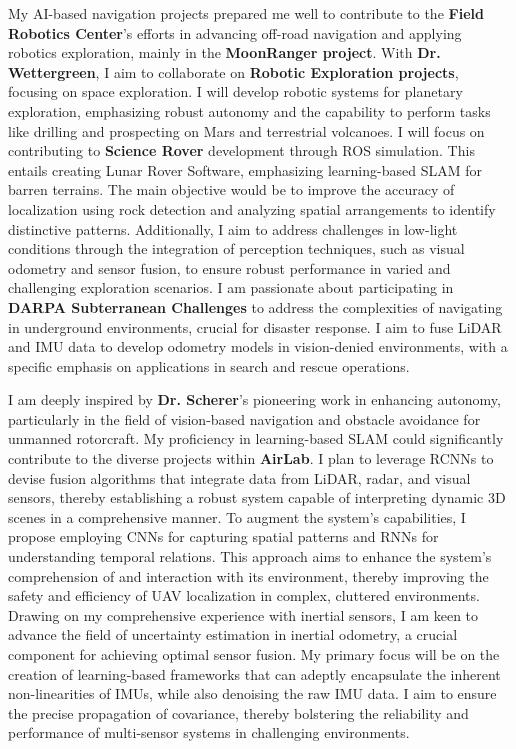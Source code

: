 \documentclass[12pt]{article}
\begin{document}
My AI-based navigation projects prepared me well to contribute to the \textbf{Field Robotics Center}'s efforts in advancing off-road navigation and applying robotics exploration, mainly in the \textbf{MoonRanger project}. With \textbf{Dr. Wettergreen}, I aim to collaborate on \textbf{Robotic Exploration projects}, focusing on space exploration. I will develop robotic systems for planetary exploration, emphasizing robust autonomy and the capability to perform tasks like drilling and prospecting on Mars and terrestrial volcanoes. I will focus on contributing to \textbf{Science Rover} development through ROS simulation. This entails creating Lunar Rover Software, emphasizing learning-based SLAM for barren terrains. The main objective would be to improve the accuracy of localization using rock detection and analyzing spatial arrangements to identify distinctive patterns. Additionally, I aim to address challenges in low-light conditions through the integration of perception techniques, such as visual odometry and sensor fusion, to ensure robust performance in varied and challenging exploration scenarios. I am passionate about participating in \textbf{DARPA Subterranean Challenges} to address the complexities of navigating in underground environments, crucial for disaster response. I aim to fuse LiDAR and IMU data to develop odometry models in vision-denied environments, with a specific emphasis on applications in search and rescue operations.

I am deeply inspired by \textbf{Dr. Scherer}'s pioneering work in enhancing autonomy, particularly in the field of vision-based navigation and obstacle avoidance for unmanned rotorcraft. My proficiency in learning-based SLAM could significantly contribute to the diverse projects within \textbf{AirLab}. I plan to leverage RCNNs to devise fusion algorithms that integrate data from LiDAR, radar, and visual sensors, thereby establishing a robust system capable of interpreting dynamic 3D scenes in a comprehensive manner. To augment the system’s capabilities, I propose employing CNNs for capturing spatial patterns and RNNs for understanding temporal relations. This approach aims to enhance the system’s comprehension of and interaction with its environment, thereby improving the safety and efficiency of UAV localization in complex, cluttered environments. Drawing on my comprehensive experience with inertial sensors, I am keen to advance the field of uncertainty estimation in inertial odometry, a crucial component for achieving optimal sensor fusion. My primary focus will be on the creation of learning-based frameworks that can adeptly encapsulate the inherent non-linearities of IMUs, while also denoising the raw IMU data. I aim to ensure the precise propagation of covariance, thereby bolstering the reliability and performance of multi-sensor systems in challenging environments.
\end{document}
